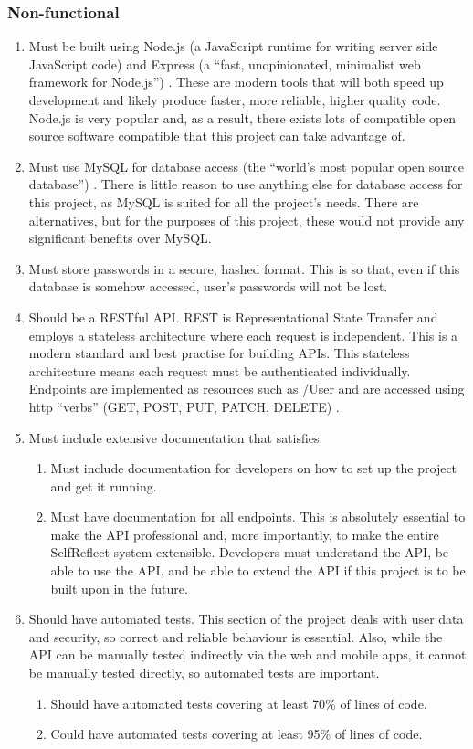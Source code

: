 \documentclass[11pt,openright,a4paper]{report}
\begin{document}
\subsubsection{Non-functional}
\begin{enumerate}
\item Must be built using Node.js (a JavaScript runtime for writing server side JavaScript code) \parencite{nodejs} and Express (a \enquote{fast, unopinionated, minimalist web framework for Node.js}) \parencite{expressjs}. These are modern tools that will both speed up development and likely produce faster, more reliable, higher quality code. Node.js is very popular and, as a result, there exists lots of compatible open source software compatible that this project can take advantage of.
\item Must use MySQL for database access (the \enquote{world's most popular open source database}) \parencite{mysql}. There is little reason to use anything else for database access for this project, as MySQL is suited for all the project's needs. There are alternatives, but for the purposes of this project, these would not provide any significant benefits over MySQL.
\item Must store passwords in a secure, hashed format. This is so that, even if this database is somehow accessed, user's passwords will not be lost.
\item Should be a RESTful API. REST is Representational State Transfer and employs a stateless architecture where each request is independent. This is a modern standard and best practise for building APIs. This stateless architecture means each request must be authenticated individually. Endpoints are implemented as resources such as /User and are accessed using http \enquote{verbs} (GET, POST, PUT, PATCH, DELETE) \parencite{httpmethods}.
\item Must include extensive documentation that satisfies:
  \begin{enumerate}
  \item Must include documentation for developers on how to set up the project and get it running.
  \item Must have documentation for all endpoints. This is absolutely essential to make the API professional and, more importantly, to make the entire SelfReflect system extensible. Developers must understand the API, be able to use the API, and be able to extend the API if this project is to be built upon in the future.
  \end{enumerate}
\item Should have automated tests. This section of the project deals with user data and security, so correct and reliable behaviour is essential. Also, while the API can be manually tested indirectly via the web and mobile apps, it cannot be manually tested directly, so automated tests are important.
  \begin{enumerate}
  \item Should have automated tests covering at least 70\% of lines of code.
  \item Could have automated tests covering at least 95\% of lines of code.
  \end{enumerate}
\end{enumerate}
\end{document}
